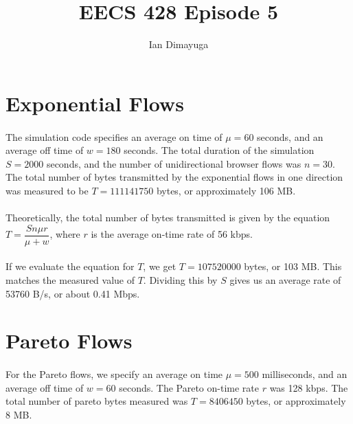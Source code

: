 \documentclass{article}
\begin{document}
\title{EECS 428 Episode 5}
\author{Ian Dimayuga}
\maketitle

\section{Exponential Flows}

\paragraph{}
The simulation code specifies an average on time of $\mu = 60$ seconds, and an average off time of $w = 180$ seconds.
The total duration of the simulation $S = 2000$ seconds, and the number of unidirectional browser flows was $n = 30$.
The total number of bytes transmitted by the exponential flows in one direction was measured to be $T = 111141750$ bytes, or approximately 106 MB.

\paragraph{}
Theoretically, the total number of bytes transmitted is given by the equation $T = \dfrac{S n \mu r}{\mu + w}$, where $r$ is the average on-time rate of 56 kbps.

\paragraph{}
If we evaluate the equation for $T$, we get $T = 107520000$ bytes, or 103 MB. This matches the measured value of $T$.
Dividing this by $S$ gives us an average rate of 53760 B/s, or about 0.41 Mbps.

\section{Pareto Flows}
\paragraph{}
For the Pareto flows, we specify an average on time $\mu = 500$ milliseconds, and an average off time of $w = 60$ seconds.
The Pareto on-time rate $r$ was 128 kbps.
The total number of pareto bytes measured was $T = 8406450$ bytes, or approximately 8 MB.
\end{document}
